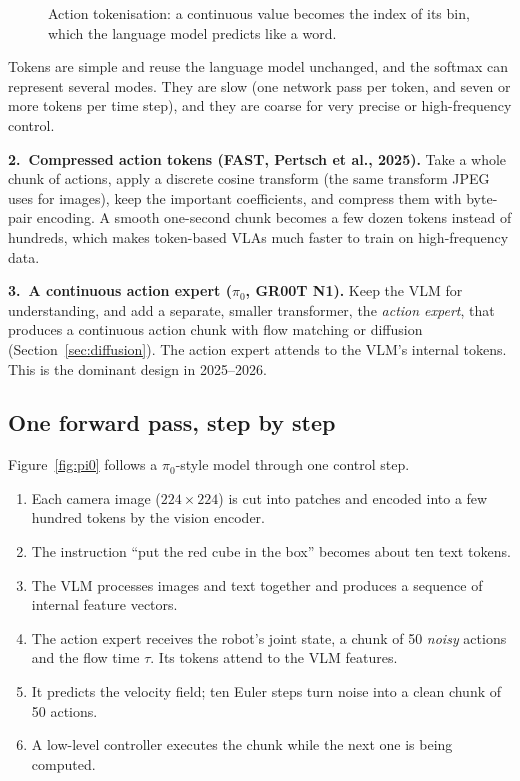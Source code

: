 \begin{figure}[h]
\centering
{}
\caption{Action tokenisation: a continuous value becomes the index of its bin, which the language model predicts like a word.}
\end{figure}

Tokens are simple and reuse the language model unchanged, and the softmax can represent several modes. They are slow (one network pass per token, and seven or more tokens per time step), and they are coarse for very precise or high-frequency control.

\textbf{2.\ Compressed action tokens (FAST, Pertsch et al., 2025).} Take a whole chunk of actions, apply a discrete cosine transform (the same transform JPEG uses for images), keep the important coefficients, and compress them with byte-pair encoding. A smooth one-second chunk becomes a few dozen tokens instead of hundreds, which makes token-based VLAs much faster to train on high-frequency data.

\textbf{3.\ A continuous action expert ($\pi_0$, GR00T N1).} Keep the VLM for understanding, and add a separate, smaller transformer, the \emph{action expert}, that produces a continuous action chunk with flow matching or diffusion (Section~\ref{sec:diffusion}). The action expert attends to the VLM's internal tokens. This is the dominant design in 2025--2026.

\subsection{One forward pass, step by step}
Figure~\ref{fig:pi0} follows a $\pi_0$-style model through one control step.
\begin{enumerate}
\item Each camera image ($224\times224$) is cut into patches and encoded into a few hundred tokens by the vision encoder.
\item The instruction ``put the red cube in the box'' becomes about ten text tokens.
\item The VLM processes images and text together and produces a sequence of internal feature vectors.
\item The action expert receives the robot's joint state, a chunk of 50 \emph{noisy} actions and the flow time $\tau$. Its tokens attend to the VLM features.
\item It predicts the velocity field; ten Euler steps turn noise into a clean chunk of 50 actions.
\item A low-level controller executes the chunk while the next one is being computed.
\end{enumerate}

